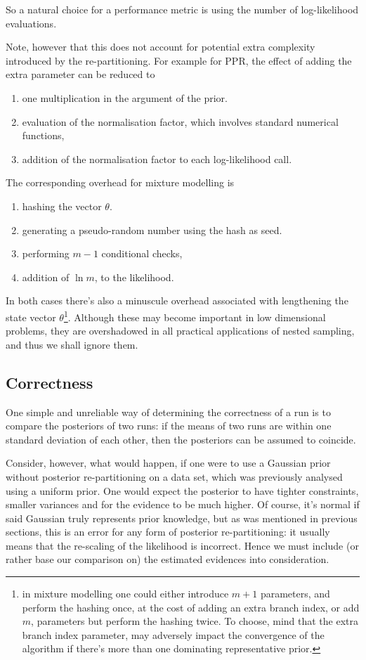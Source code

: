 \documentclass[usenatbib]{mnras}
\begin{document}
So a natural choice for a performance metric is using the number of
log-likelihood evaluations. 

Note, however that this does not account for potential extra
complexity introduced by the re-partitioning. For example for PPR,
the effect of adding the extra parameter can be reduced to
\begin{enumerate}
\item one multiplication in the argument of the prior.
\item evaluation of the normalisation factor, which involves standard
numerical functions,
\item addition of the normalisation factor to each log-likelihood call.
\end{enumerate}

The corresponding overhead for mixture modelling is
\begin{enumerate}
\item hashing the vector \(\theta\).
\item generating a pseudo-random number using the hash as seed.
\item performing \(m-1\) conditional checks,
\item addition of \(\ln m\), to the likelihood.
\end{enumerate}

In both cases there's also a minuscule overhead associated with
lengthening the state vector \(\theta\)\footnote{in mixture modelling one could either introduce \(m+1\) parameters, and perform the hashing once, at the cost of adding an extra branch index, or add \(m\), parameters but perform the hashing twice. To choose, mind that the extra branch index parameter, may adversely impact the convergence of the algorithm if there's more than one dominating representative prior.}.
Although these may become important in low dimensional problems,
they are overshadowed in all practical applications of nested
sampling, and thus we shall ignore them.

\subsection{Correctness}
\label{sec:orgf760561}
One simple and unreliable way of determining the correctness of a
run is to compare the posteriors of two runs: if the means of two
runs are within one standard deviation of each other, then the
posteriors can be assumed to coincide.

Consider, however, what would happen, if one were to use a Gaussian
prior without posterior re-partitioning on a data set, which was
previously analysed using a uniform prior. One would expect the
posterior to have tighter constraints, smaller variances and for
the evidence to be much higher. Of course, it's normal if said
Gaussian truly represents prior knowledge, but as was mentioned in
previous sections, this is an error for any form of posterior
re-partitioning: it usually means that the re-scaling of the
likelihood is incorrect. Hence we must include (or rather base our
comparison on) the estimated evidences into consideration.
\end{document}
